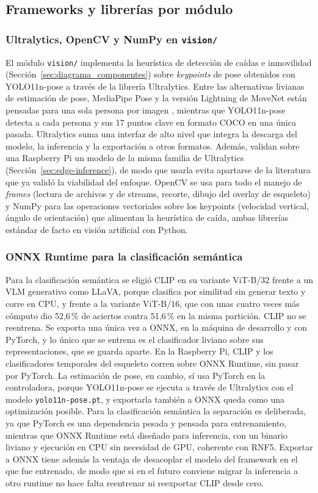 \subsection{Frameworks y librerías por módulo}

\subsubsection*{Ultralytics, OpenCV y NumPy en \texttt{vision/}}
El módulo \texttt{vision/} implementa la heurística de detección de caídas e inmovilidad (Sección~\ref{sec:diagrama_componentes}) sobre \textit{keypoints} de pose obtenidos con YOLO11n-pose a través de la librería Ultralytics.
Entre las alternativas livianas de estimación de pose, MediaPipe Pose y la versión Lightning de MoveNet están pensadas para una sola persona por imagen \parencite{Bazarevsky2020,TFMoveNet}, mientras que YOLO11n-pose detecta a cada persona y sus 17 puntos clave en formato COCO en una única pasada.
Ultralytics suma una interfaz de alto nivel que integra la descarga del modelo, la inferencia y la exportación a otros formatos.
Además, \textcite{Giri2025} validan sobre una Raspberry Pi un modelo de la misma familia de Ultralytics (Sección~\ref{sec:edge-inference}), de modo que usarla evita apartarse de la literatura que ya validó la viabilidad del enfoque.
OpenCV se usa para todo el manejo de \textit{frames} (lectura de archivos y de streams, recorte, dibujo del overlay de esqueleto) y NumPy para las operaciones vectoriales sobre los keypoints (velocidad vertical, ángulo de orientación) que alimentan la heurística de caída, ambas librerías estándar de facto en visión artificial con Python.

\subsubsection*{ONNX Runtime para la clasificación semántica}
Para la clasificación semántica se eligió CLIP en su variante ViT-B/32 frente a un VLM generativo como LLaVA, porque clasifica por similitud sin generar texto y corre en CPU, y frente a la variante ViT-B/16, que con unas cuatro veces más cómputo dio 52,6\,\% de aciertos contra 51,6\,\% en la misma partición.
CLIP no se reentrena.
Se exporta una única vez a ONNX, en la máquina de desarrollo y con PyTorch, y lo único que se entrena es el clasificador liviano sobre sus representaciones, que se guarda aparte.
En la Raspberry Pi, CLIP y los clasificadores temporales del esqueleto corren sobre ONNX Runtime, sin pasar por PyTorch.
La estimación de pose, en cambio, sí usa PyTorch en la controladora, porque YOLO11n-pose se ejecuta a través de Ultralytics con el modelo \texttt{yolo11n-pose.pt}, y exportarla también a ONNX queda como una optimización posible.
Para la clasificación semántica la separación es deliberada, ya que PyTorch es una dependencia pesada y pensada para entrenamiento, mientras que ONNX Runtime está diseñado para inferencia, con un binario liviano y ejecución en CPU sin necesidad de GPU, coherente con RNF5.
Exportar a ONNX tiene además la ventaja de desacoplar el modelo del framework en el que fue entrenado, de modo que si en el futuro conviene migrar la inferencia a otro runtime no hace falta reentrenar ni reexportar CLIP desde cero.

